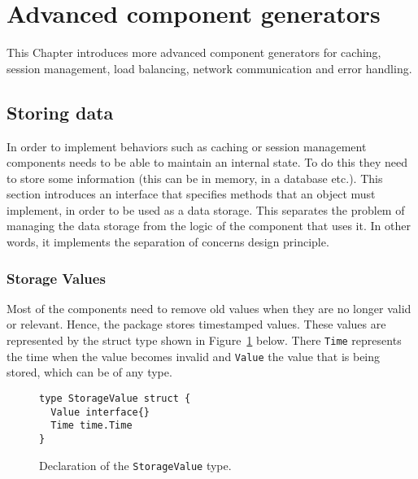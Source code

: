 \section{Advanced component generators}
\label{sec:impl2}
This Chapter introduces more advanced component generators for caching,
session management, load balancing, network communication and error handling.

\subsection{Storing data}
In order to implement behaviors such as caching or session management
components needs to be able to maintain an internal state.
To do this they need to store some information (this can be in memory, 
in a database etc.).
This section introduces an interface that specifies methods that an 
object must implement, in order to be used as a data storage. This 
separates the problem of managing the data storage from the logic of
the component that uses it. In other words, it implements the separation 
of concerns design principle.

\subsubsection{Storage Values}
Most of the components need to remove old values when they are no longer
valid or relevant. Hence, the package stores timestamped values. 
These values are represented by the struct type shown in 
Figure~\ref{fig:StorageValue} below. There \texttt{Time} represents the time 
when the value becomes invalid and \texttt{Value} the value that is being
stored, which can be of any type.
\begin{figure}[h]
\centering
\begin{lstlisting}
type StorageValue struct {
  Value interface{}
  Time time.Time
}
\end{lstlisting}
\caption[scale=1.0]{Declaration of the \texttt{StorageValue} type.}
\label{fig:StorageValue}
\end{figure}

